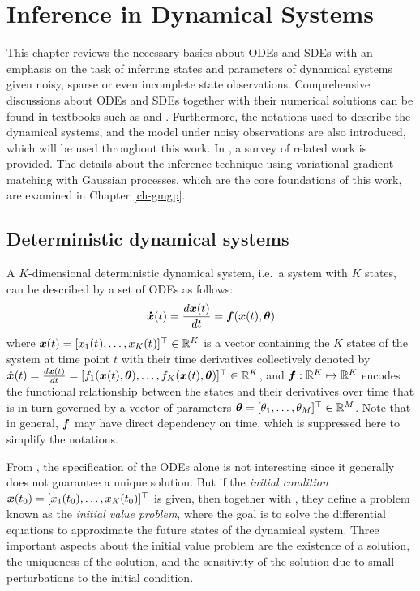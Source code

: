 \chapter{Inference in Dynamical Systems}
\label{ch-dynamical-systems}

This chapter reviews the necessary basics about ODEs  and SDEs  with an emphasis on the task of inferring states and parameters of dynamical systems given noisy, sparse or even incomplete state observations. 
Comprehensive discussions about ODEs and SDEs together with their numerical solutions can be found in textbooks such as \cite{butcher2016numerical} and \cite{oksendal2013stochastic}.
Furthermore, the notations used to describe the dynamical systems, and the model under noisy observations are also introduced, which will be used throughout this work.
In , a survey of related work is provided.
The details about the inference technique using variational gradient matching with Gaussian processes, which are the core foundations of this work, are examined in Chapter \ref{ch-gmgp}. 

\section{Deterministic dynamical systems}
\label{sec-odes}

A $K$-dimensional deterministic dynamical system, i.e.\ a system with $K$ states, can be described by a set of ODEs as follows:
\begin{align}
    \boldsymbol{\dot{x}}(t) = \frac{d\boldsymbol{x}(t)}{dt} = \boldsymbol{f}(\boldsymbol{x}(t), \boldsymbol{\theta})
    \label{eq-odes}
\end{align}
where $\boldsymbol{x}(t) = [x_{1}(t_{}),\dots,x_{K}(t_{})]^\top \in \mathbb{R}^K$ is a vector containing the $K$ states of the system at time point $t$ with their time derivatives collectively denoted by $\boldsymbol{\dot{x}}(t) = \frac{d\boldsymbol{x}(t)}{dt} = [f_{1}(\boldsymbol{x}(t), \boldsymbol{\theta}),\dots,f_{K}(\boldsymbol{x}(t), \boldsymbol{\theta})]^\top \in \mathbb{R}^K$, and $\boldsymbol{f} : \mathbb{R}^K \mapsto \mathbb{R}^K$ encodes the functional relationship between the states and their derivatives over time that is in turn governed by a vector of parameters  $\boldsymbol{\theta} = [\theta_{1},\dots,\theta_{M}]^\top \in \mathbb{R}^M$. 
Note that in general, $\boldsymbol{f}$ may have direct dependency on time, which is suppressed here to simplify the notations.

From \cite{butcher2016numerical}, the specification of the ODEs alone is not interesting since it generally does not guarantee a unique solution. 
But if the \emph{initial condition} $\boldsymbol{x}(t_{0}) = [x_{1}(t_{0}),\dots,x_{K}(t_{0})]^\top$ is given, then together with , they define a problem known as the \emph{initial value problem}, where the goal is to solve the differential equations to approximate the future states of the dynamical system.
Three important aspects about the initial value problem are the existence of a solution, the uniqueness of the solution, and the sensitivity of the solution due to small perturbations to the initial condition.

